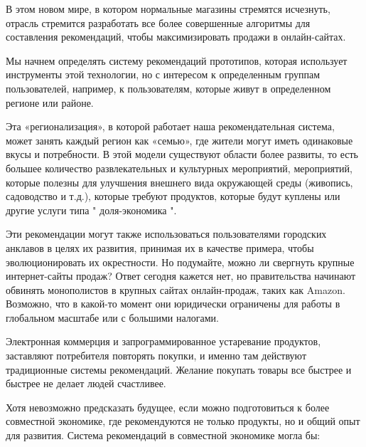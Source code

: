 В этом новом мире, в котором нормальные магазины стремятся исчезнуть, отрасль стремится разработать все более совершенные алгоритмы для составления рекомендаций, чтобы максимизировать продажи в онлайн-сайтах.

Мы начнем определять систему рекомендаций прототипов, которая использует инструменты этой технологии, но с интересом к определенным группам пользователей, например, к пользователям, которые живут в определенном регионе или районе.

Эта «регионализация», в которой работает наша рекомендательная система, может занять каждый регион как «семью», где жители могут иметь одинаковые вкусы и потребности. В этой модели существуют области более развиты, то есть большее количество развлекательных и культурных мероприятий, мероприятий, которые полезны для улучшения внешнего вида окружающей среды (живопись, садоводство и т.д.), которые требуют продуктов, которые будут куплены или другие услуги типа " доля-экономика "\cite{shared_economy}.

Эти рекомендации могут также использоваться пользователями городских анклавов в целях их развития, принимая их в качестве примера, чтобы эволюционировать их окрестности. Но подумайте, можно ли свергнуть крупные интернет-сайты продаж? Ответ сегодня кажется нет, но правительства начинают обвинять монополистов в крупных сайтах онлайн-продаж, таких как Amazon. Возможно, что в какой-то момент они юридически ограничены для работы в глобальном масштабе или с большими налогами.

Электронная коммерция и запрограммированное устаревание \cite{planned_obsolescence} продуктов, заставляют потребителя повторять покупки, и именно там действуют традиционные системы рекомендаций. Желание покупать товары все быстрее и быстрее не делает людей счастливее.

Хотя невозможно предсказать будущее, если можно подготовиться к более совместной экономике, где рекомендуются не только продукты, но и общий опыт для развития. Система рекомендаций в совместной экономике могла бы:



